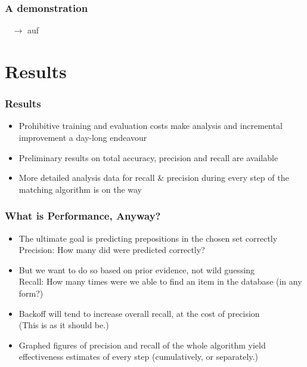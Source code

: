 \documentclass{beamer}
\begin{document}
\begin{frame}
\frametitle{A demonstration}


\mbox{   } 
{$\to$ auf}


\end{frame}
\section{Results}
\begin{frame}
\frametitle{Results}
\begin{itemize}
\item Prohibitive training and evaluation costs make analysis and incremental
improvement a day-long endeavour
\item Preliminary results on total accuracy, precision and recall are available
\item More detailed analysis data for recall \& precision during every step of
the matching algorithm is on the way
\end{itemize}
\end{frame}

\begin{frame}
\frametitle{What is Performance, Anyway?}

\begin{itemize}
\item The ultimate goal is predicting prepositions in the chosen set
correctly\\\alert{Precision:} How many did were predicted correctly?
\item But we want to do so based on prior evidence, not wild guessing\\
\alert{Recall:} How many times were we able to find an item in the database (in any
form?)
\item Backoff will tend to increase overall recall, at the cost of precision\\(This is
as it should be.)
\item Graphed figures of precision and recall of the whole algorithm yield
effectiveness estimates of every step (cumulatively, or separately.)
\end{itemize}
\end{frame}
\end{document}
